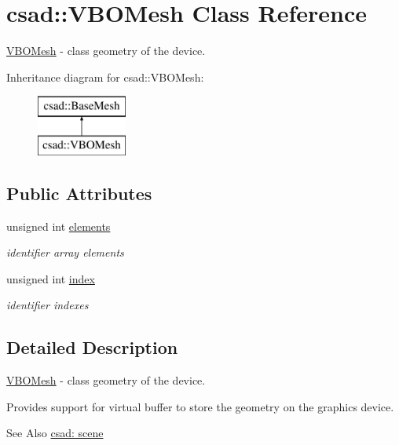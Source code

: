 \hypertarget{classcsad_1_1_v_b_o_mesh}{\section{csad\-:\-:V\-B\-O\-Mesh Class Reference}
\label{classcsad_1_1_v_b_o_mesh}
}


\hyperlink{classcsad_1_1_v_b_o_mesh}{V\-B\-O\-Mesh} -\/ class geometry of the device.  


Inheritance diagram for csad\-:\-:V\-B\-O\-Mesh\-:\begin{figure}[H]
\begin{center}
\leavevmode
\includegraphics[height=2.000000cm]{classcsad_1_1_v_b_o_mesh}
\end{center}
\end{figure}
\subsection*{Public Attributes}
\begin{DoxyCompactItemize}
\item 
\hypertarget{classcsad_1_1_v_b_o_mesh_af465608edde03a20effa59c302f904b2}{unsigned int \hyperlink{classcsad_1_1_v_b_o_mesh_af465608edde03a20effa59c302f904b2}{elements}}\label{classcsad_1_1_v_b_o_mesh_af465608edde03a20effa59c302f904b2}

\begin{DoxyCompactList}\small\item\em identifier array elements \end{DoxyCompactList}\item 
\hypertarget{classcsad_1_1_v_b_o_mesh_a83c1f273c1431edf40ce3919d6899626}{unsigned int \hyperlink{classcsad_1_1_v_b_o_mesh_a83c1f273c1431edf40ce3919d6899626}{index}}\label{classcsad_1_1_v_b_o_mesh_a83c1f273c1431edf40ce3919d6899626}

\begin{DoxyCompactList}\small\item\em identifier indexes \end{DoxyCompactList}\end{DoxyCompactItemize}


\subsection{Detailed Description}
\hyperlink{classcsad_1_1_v_b_o_mesh}{V\-B\-O\-Mesh} -\/ class geometry of the device. 

Provides support for virtual buffer to store the geometry on the graphics device.

\begin{DoxySeeAlso}{See Also}
\hyperlink{group__scene}{csad\-: scene} 
\end{DoxySeeAlso}
